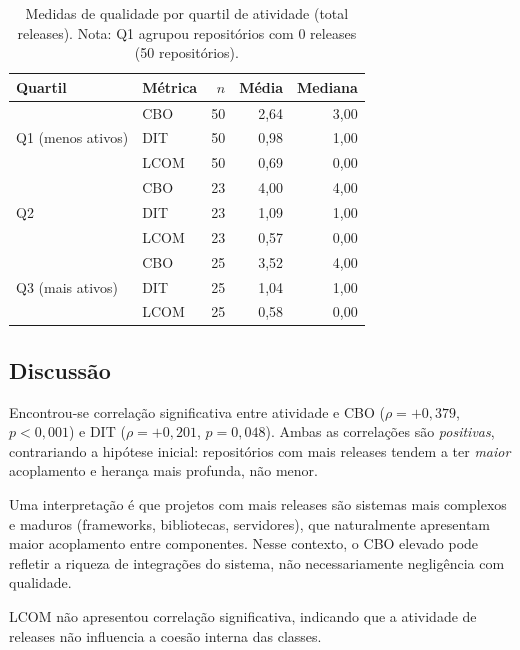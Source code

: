 \documentclass[12pt,a4paper]{article}
\begin{document}
\begin{table}[htbp]
\centering
\caption{Medidas de qualidade por quartil de atividade (total releases).
Nota: Q1 agrupou repositórios com 0 releases (50 repositórios).}
\label{tab:rq03_quartis}
\small
\begin{tabular}{llrrr}
\toprule
\textbf{Quartil} & \textbf{Métrica} & \textbf{$n$} & \textbf{Média} & \textbf{Mediana} \\
\midrule
\multirow{3}{*}{Q1 (menos ativos)} & CBO & 50 & 2,64 & 3,00 \\
                                    & DIT & 50 & 0,98 & 1,00 \\
                                    & LCOM& 50 & 0,69 & 0,00 \\
\midrule
\multirow{3}{*}{Q2}                 & CBO & 23 & 4,00 & 4,00 \\
                                    & DIT & 23 & 1,09 & 1,00 \\
                                    & LCOM& 23 & 0,57 & 0,00 \\
\midrule
\multirow{3}{*}{Q3 (mais ativos)}   & CBO & 25 & 3,52 & 4,00 \\
                                    & DIT & 25 & 1,04 & 1,00 \\
                                    & LCOM& 25 & 0,58 & 0,00 \\
\bottomrule
\end{tabular}
\end{table}

\subsection{Discussão}

Encontrou-se correlação significativa entre atividade e CBO ($\rho = +0{,}379$,
$p < 0{,}001$) e DIT ($\rho = +0{,}201$, $p = 0{,}048$). Ambas as correlações
são \emph{positivas}, contrariando a hipótese inicial: repositórios com mais
releases tendem a ter \emph{maior} acoplamento e herança mais profunda,
não menor.

Uma interpretação é que projetos com mais releases são sistemas mais complexos
e maduros (frameworks, bibliotecas, servidores), que naturalmente apresentam
maior acoplamento entre componentes. Nesse contexto, o CBO elevado pode refletir
a riqueza de integrações do sistema, não necessariamente negligência com
qualidade.

LCOM não apresentou correlação significativa, indicando que a atividade
de releases não influencia a coesão interna das classes.
\end{document}
